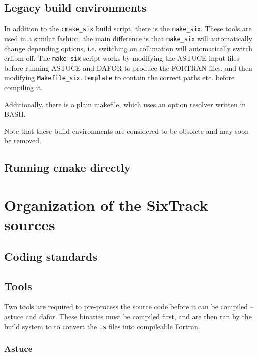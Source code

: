 \documentclass[english,BCOR=0mm,DIV=18]{scrartcl}
\begin{document}

\subsection{Legacy build environments}

In addition to the \texttt{cmake\_six} build script, there is the \texttt{make\_six}.
These tools are used in a similar fashion, the main difference is that \texttt{make\_six} will automatically change depending options, i.e. switching on collimation will automatically switch crlibm off.
The \texttt{make\_six} script works by modifying the ASTUCE input files before running ASTUCE and DAFOR to produce the FORTRAN files, and then modifying \texttt{Makefile\_six.template} to contain the correct paths etc. before compiling it.

Additionally, there is a plain makefile, which uses an option resolver written in BASH.

Note that these build environments are considered to be obsolete and may soon be removed.

\subsection{Running cmake directly}

\section{Organization of the SixTrack sources}

\subsection{Coding standards}

\subsection{Tools}

Two tools are required to pre-process the source code before it can be compiled -- astuce and dafor.
These binaries must be compiled first, and are then ran by the build system to to convert the \texttt{.s} files into compileable Fortran.

\subsubsection{Astuce}
\end{document}

